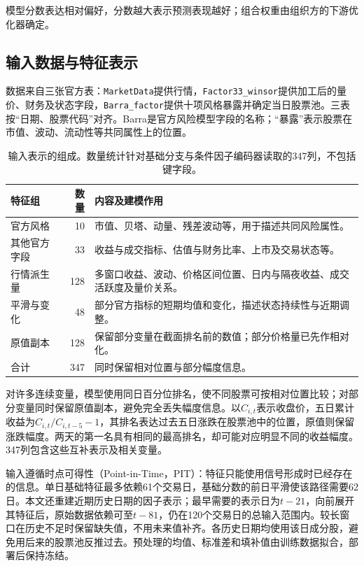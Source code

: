 \documentclass[UTF8,11pt,a4paper,fontset=fandol]{ctexart}
\begin{document}
模型分数表达相对偏好，分数越大表示预测表现越好；组合权重由组织方的下游优化器确定。

\subsection{输入数据与特征表示}
数据来自三张官方表：\texttt{MarketData}提供行情，\texttt{Factor33\_winsor}提供加工后的量价、财务及状态字段，\texttt{Barra\_factor}提供十项风格暴露并确定当日股票池。三表按“日期、股票代码”对齐。Barra是官方风险模型字段的名称；“暴露”表示股票在市值、波动、流动性等共同属性上的位置。

\begin{table}[htbp]\centering\small
\caption{输入表示的组成。数量统计针对基础分支与条件因子编码器读取的347列，不包括键字段。}\label{tab:features}
\begin{tabularx}{\linewidth}{l r X}\toprule
特征组 & 数量 & 内容及建模作用\\\midrule
官方风格 & 10 & 市值、贝塔、动量、残差波动等，用于描述共同风险属性。\\
其他官方字段 & 33 & 收益与成交指标、估值与财务比率、上市及交易状态等。\\
行情派生量 & 128 & 多窗口收益、波动、价格区间位置、日内与隔夜收益、成交活跃度及量价关系。\\
平滑与变化 & 48 & 部分官方指标的短期均值和变化，描述状态持续性与近期调整。\\
原值副本 & 128 & 保留部分变量在截面排名前的数值；部分价格量已先作相对化。\\\midrule
合计 & 347 & 同时保留相对位置与部分幅度信息。\\\bottomrule
\end{tabularx}
\end{table}

对许多连续变量，模型使用同日百分位排名，使不同股票可按相对位置比较；对部分变量同时保留原值副本，避免完全丢失幅度信息。以$C_{i,t}$表示收盘价，五日累计收益为$C_{i,t}/C_{i,t-5}-1$，其排名表达过去五日涨跌在股票池中的位置，原值则保留涨跌幅度。两天的第一名具有相同的最高排名，却可能对应明显不同的收益幅度。347列包含这些互补表示及相关变量。

输入遵循时点可得性（Point-in-Time，PIT）：特征只能使用信号形成时已经存在的信息\cite{competition}。单日基础特征最多依赖61个交易日，基础分数的前日平滑使该路径需要62日。本文还重建近期历史日期的因子表示；最早需要的表示日为$t-21$，向前展开其特征后，原始数据依赖可至$t-81$，仍在120个交易日的总输入范围内。较长窗口在历史不足时保留缺失值，不用未来值补齐。各历史日期均使用该日成分股，避免用后来的股票池反推过去。预处理的均值、标准差和填补值由训练数据拟合，部署后保持冻结。
\end{document}
